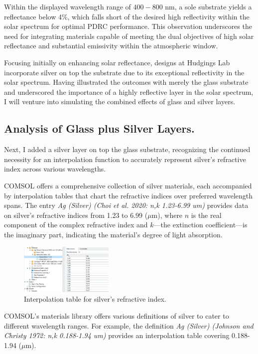 Within the displayed wavelength range of $400 - 800$ nm, a sole substrate yields a reflectance below 4\%, which falls short of the desired high reflectivity within the solar spectrum for optimal PDRC performance. This observation underscores the need for integrating materials capable of meeting the dual objectives of high solar reflectance and substantial emissivity within the atmospheric window.

Focusing initially on enhancing solar reflectance, designs at Hudgings Lab incorporate silver on top the substrate due to its exceptional reflectivity in the solar spectrum. Having illustrated the outcomes with merely the glass substrate and underscored the importance of a highly reflective layer in the solar spectrum, I will venture into simulating the combined effects of glass and silver layers.

\subsection{Analysis of Glass plus Silver Layers.}
Next, I added a silver layer on top the glass substrate, recognizing the continued necessity for an interpolation function to accurately represent silver's refractive index across various wavelengths.

COMSOL offers a comprehensive collection of silver materials, each accompanied by interpolation tables that chart the refractive indices over preferred wavelength spans. The entry \emph{Ag (Silver) (Choi et al. 2020: n,k 1.23-6.99 um)} provides data on silver’s refractive indices from 1.23 to 6.99 ($\mu$m), where $n$ is the real component of the complex refractive index and $k$—the extinction coefficient—is the imaginary part, indicating the material's degree of light absorption.

\begin{figure}[ht!]
  \centering
  \includegraphics[width=0.4\textwidth]{Chapters/Figures/Chapter 4 Figures/Interpolation Table for Silver.png}
  \caption{Interpolation table for silver's refractive index.}
  \label{fig:Interpolation table for silver's refractive index}
\end{figure}

COMSOL's materials library offers various definitions of silver to cater to different wavelength ranges. For example, the definition \emph{Ag (Silver) (Johnson and Christy 1972: n,k 0.188-1.94 um)} provides an interpolation table covering 0.188-1.94 ($\mu$m).


